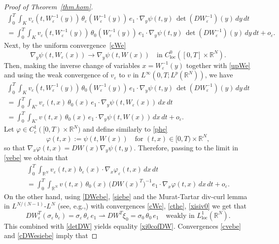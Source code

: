 \documentclass[11pt]{article}
\newcommand{\eg}{e.g.,\xspace}
\newcommand{\loc}{\mathrm{loc}}
\newcommand{\spfrac}[2]{{#1}/{(#2)}}
\let \ph \varphi
\def \RR {\mathbb R}
\theoremstyle{plain}
\theoremstyle{definition}
\numberwithin{equation}{section}
\begin{document}
\begin{proof}[Proof of Theorem~\ref{thm.hom}]
\begin{multline*}
 \int_0^T\!\!\int_{K}v_\varepsilon(t,W_\varepsilon^{-1}(y))\,\theta_\varepsilon(W_\varepsilon^{-1}(y))\,e_1\cdot\nabla_y\psi(t,y)\,\det(DW_\varepsilon^{-1})(y)\,dy\,dt
\\
=\int_0^T\!\!\int_{K}v_\varepsilon(t,W_\varepsilon^{-1}(y))\,\theta_0(W_\varepsilon^{-1}(y))\,e_1\cdot\nabla_y\psi(t,y)\,\det(DW_\varepsilon^{-1})(y)\,dy\,dt+o_\varepsilon.
\end{multline*}
Next, by the uniform convergence~\eqref{cWe}
\[
\nabla_y\psi(t,W_\varepsilon(x))\to\nabla_y\psi(t,W(x))\quad\mbox{in }C^0_\loc([0,T]\times\RR^N).
\]
Then, making the inverse change of variables $x=W_\varepsilon^{-1}(y)$ together with \eqref{upWe} and using the weak convergence of $v_\varepsilon$ to $v$ in $L^\infty(0,T;L^p(\RR^N))$, we have
\begin{multline*}
 \int_0^T\!\!\int_{K}v_\varepsilon(t,W_\varepsilon^{-1}(y))\,\theta_0(W_\varepsilon^{-1}(y))\,e_1\cdot\nabla_y\psi(t,y)\,\det(DW_\varepsilon^{-1})(y)\,dy\,dt
\\
= \int_0^T\!\!\int_{K'}v_\varepsilon(t,x)\,\theta_0(x)\,e_1\cdot\nabla_y\psi(t,W_\varepsilon(x))\,dx\,dt
\\
=\int_0^T\!\!\int_{K'}v(t,x)\,\theta_0(x)\,e_1\cdot\nabla_y\psi(t,W(x))\,dx\,dt+o_\varepsilon.
\end{multline*}
Let $\ph\in C^1_c([0,T)\times\RR^N)$ and define similarly to \eqref{phe}
\[
\ph(t,x):=\psi(t, W(x))\quad\mbox{for }(t,x)\in[0,T)\times\RR^N,
\]
so that $\nabla_x\ph(t,x)=DW(x)\nabla_y\psi(t,y)$.
Therefore, passing to the limit in \eqref{vebe} we obtain that
\begin{multline}\label{cvebe}
\int_0^T\!\!\int_{\RR^N}v_\varepsilon(t,x)\,b_\varepsilon(x)\cdot\nabla_x\ph_\varepsilon(t,x)\,dx\,dt
\\
=\int_0^T\!\!\int_{\RR^N}v(t,x)\,\theta_0(x)\,\big(DW(x)^T\big)^{-1}e_1\cdot\nabla_x\ph(t,x)\,dx\,dt+o_\varepsilon.
\end{multline}
On the other hand, using \eqref{DWebe}, \eqref{siebe} and the Murat-Tartar div-curl lemma in $L^{\spfrac{N}{N-1}}$-$L^N$ (see, \eg \cite[Th.\,2]{Mur}) with convergences \eqref{cWe}, \eqref{cthe}, \eqref{xisiv0} we get that
\begin{equation}\label{cDWesiebe}
DW_\varepsilon^T(\sigma_\varepsilon\,b_\varepsilon)=\sigma_\varepsilon\,\theta_\varepsilon\,e_1\rightharpoonup DW^T\xi_0=\sigma_0\,\theta_0\,e_1\quad\mbox{weakly in }L^1_\loc(\RR^N).
\end{equation}
This combined with \eqref{detDW} yields equality \eqref{xi0cofDW}.
Convergences \eqref{cvebe} and \eqref{cDWesiebe} imply that

\end{proof}
\end{document}
